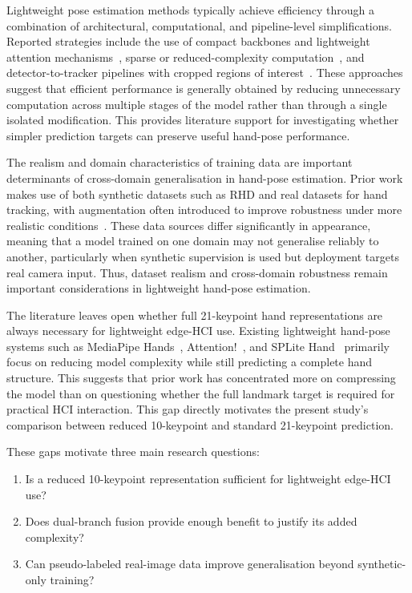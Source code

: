 \documentclass[10pt,letterpaper]{article}
\begin{document}
\medskip
Lightweight pose estimation methods typically achieve efficiency through a combination of architectural, computational, and pipeline-level simplifications. Reported strategies include the use of compact backbones and lightweight attention mechanisms~\cite{attentionlite}, sparse or reduced-complexity computation~\cite{splitehand}, and detector-to-tracker pipelines with cropped regions of interest~\cite{mediapipe}. These approaches suggest that efficient performance is generally obtained by reducing unnecessary computation across multiple stages of the model rather than through a single isolated modification. This provides literature support for investigating whether simpler prediction targets can preserve useful hand-pose performance.

\medskip
The realism and domain characteristics of training data are important determinants of cross-domain generalisation in hand-pose estimation. Prior work makes use of both synthetic datasets such as RHD and real datasets for hand tracking, with augmentation often introduced to improve robustness under more realistic conditions~\cite{handobjectgcn,lightweightgcnhand,handaugment}. These data sources differ significantly in appearance, meaning that a model trained on one domain may not generalise reliably to another, particularly when synthetic supervision is used but deployment targets real camera input. Thus, dataset realism and cross-domain robustness remain important considerations in lightweight hand-pose estimation.

\medskip
The literature leaves open whether full 21-keypoint hand representations are always necessary for lightweight edge-HCI use. Existing lightweight hand-pose systems such as MediaPipe Hands~\cite{mediapipe}, Attention!~\cite{attentionlite}, and SPLite Hand~\cite{splitehand} primarily focus on reducing model complexity while still predicting a complete hand structure. This suggests that prior work has concentrated more on compressing the model than on questioning whether the full landmark target is required for practical HCI interaction. This gap directly motivates the present study’s comparison between reduced 10-keypoint and standard 21-keypoint prediction.

\medskip
These gaps motivate three main research questions:
\begin{enumerate}
    \item Is a reduced 10-keypoint representation sufficient for lightweight edge-HCI use?
    \item Does dual-branch fusion provide enough benefit to justify its added complexity?
    \item Can pseudo-labeled real-image data improve generalisation beyond synthetic-only training?
\end{enumerate}
\end{document}
